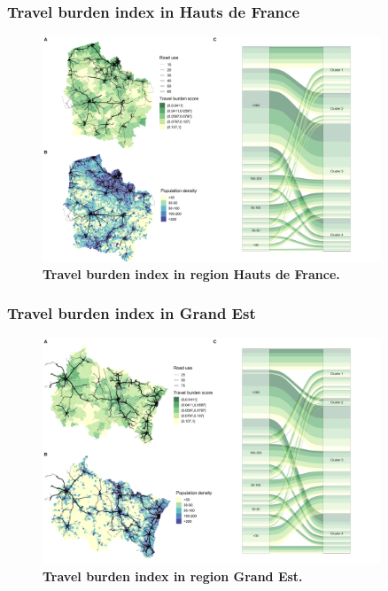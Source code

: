 \subsubsection{Travel burden index in Hauts de France}

\begin{figure}[H]
    \includegraphics[width=0.9\textwidth]{images/routes/fig4_32.png}
    \centering
    \caption{
        \textbf{Travel burden index in region Hauts de France.}
    }
    \label{fig:routes-burden-index-hdf}
\end{figure}

\subsubsection{Travel burden index in Grand Est}

\begin{figure}[H]
    \includegraphics[width=0.9\textwidth]{images/routes/fig4_44.png}
    \centering
    \caption{
        \textbf{Travel burden index in region Grand Est.}
    }
    \label{fig:routes-burden-index-ge}
\end{figure}

